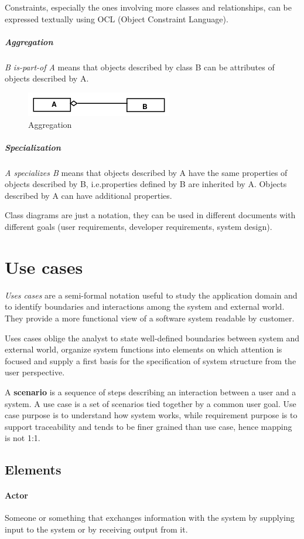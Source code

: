 Constraints, especially the ones involving more classes and relationships, can be expressed textually using OCL (Object Constraint Language).

\subparagraph{Aggregation}
\emph{B is-part-of A} means that objects described by class B can be attributes of objects described by A.

\begin{figure}[hbtp]
\centering
\includegraphics[scale=0.4]{images/uml_aggregation.png}
\caption{Aggregation}
\end{figure}

\subparagraph{Specialization}
\emph{A specializes B} means that objects described by A have the same properties of objects described by B, i.e.\@ properties defined by B are inherited by A. Objects described by A can have additional properties. 

Class diagrams are just a notation, they can be used in different documents with different goals (user requirements, developer requirements, system design).

\section{Use cases}
\emph{Uses cases} are a semi-formal notation useful to study the application domain and to identify boundaries and interactions among the system and external world. They provide a more functional view of a software system readable by customer.

Uses cases oblige the analyst to state well-defined boundaries between system and external world, organize system functions into elements on which attention is focused and supply a first basis for the specification of system structure from the user perspective.

A \textbf{scenario} is a sequence of steps describing an interaction between a user and a system. A use case is a set of scenarios tied together by a common user goal. Use case purpose is to understand how system works, while requirement purpose is to support traceability and tends to be finer grained than use case, hence mapping is not 1:1.

\subsection{Elements}
\paragraph{Actor}
Someone or something that exchanges information with the system by supplying input to the system or by receiving output from it.

